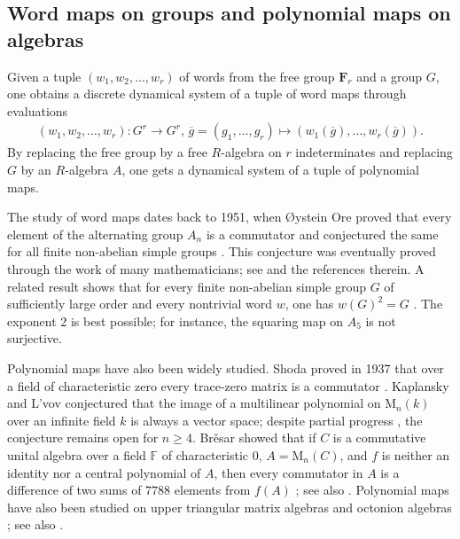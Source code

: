 \documentclass[11pt,twoside]{amsart}
\newcommand{\M}{\mathrm{M}}
\theoremstyle{definition} %
\begin{document}
\subsection{Word maps on groups and polynomial maps on algebras}
Given a tuple $(w_1,w_2,\ldots,w_r)$ of words from the free group $\mathbf F_r$ and a group $G$, one obtains a discrete dynamical system of a tuple of word maps through evaluations
\begin{align*}
    (w_1,w_2,\ldots,w_r):G^r\longrightarrow G^r,\,\overline{g}=(g_1,\ldots, g_r)\mapsto(w_1(\overline{g}),\ldots, w_r(\overline{g})).
\end{align*}
By replacing the free group by a free $R$-algebra on $r$ indeterminates and replacing $G$ by an $R$-algebra $A$, one gets a dynamical system of a tuple of polynomial maps.

The study of word maps dates back to 1951, when {\O}ystein Ore proved that every element of the alternating group $A_n$ is a commutator and conjectured the same for all finite non-abelian simple groups \cite{Ore1951}. This conjecture was eventually proved through the work of many mathematicians; see \cite{LiebeckObrienShalevTiep2010} and the references therein. A related result shows that for every finite non-abelian simple group $G$ of sufficiently large order and every nontrivial word $w$, one has $w(G)^2 = G$ \cite{LarsenShalevTiep2011}. The exponent $2$ is best possible; for instance, the squaring map on $A_5$ is not surjective.

Polynomial maps have also been widely studied. Shoda proved in 1937 that over a field of characteristic zero every trace-zero matrix is a commutator \cite{Shoda1937}. Kaplansky and L'vov conjectured that the image of a multilinear polynomial on $\mathrm{M}_n(k)$ over an infinite field $k$ is always a vector space; despite partial progress \cite{KanelMalevRowen2012,KanelMalevRowen2016}, the conjecture remains open for $n \ge 4$. Br\v esar showed that if $C$ is a commutative unital algebra over a field $\mathbb F$ of characteristic $0$, $A=\M_n(C)$, and $f$ is neither an identity nor a central polynomial of $A$, then every commutator in $A$ is a difference of two sums of $7788$ elements from $f(A)$ \cite{Bresar2020}; see also \cite{BresarVolcic2025}. Polynomial maps have also been studied on upper triangular matrix algebras \cite{GargateDeMello2022,PanjaPrasad2023} and octonion algebras \cite{PanjaSainiSingh2025}; see also \cite{PanjaSainiSinghConst}.
\end{document}
